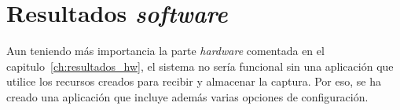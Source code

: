 \chapter{Resultados \emph{software}}
\label{ch:resultados_sw}


Aun teniendo más importancia la parte \emph{hardware} comentada en el capitulo~\ref{ch:resultados_hw}, el sistema no sería funcional sin una aplicación que utilice los recursos creados para recibir y almacenar la captura. Por eso, se ha creado una aplicación que incluye además varias opciones de configuración.

